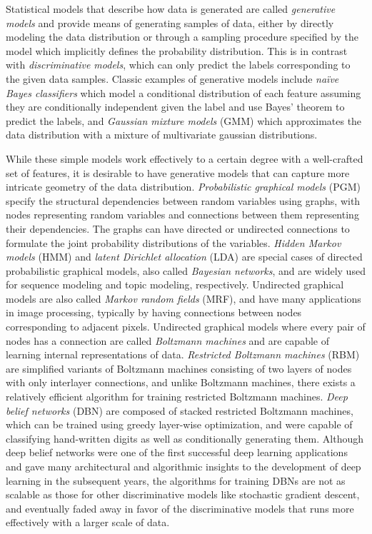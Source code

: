 Statistical models that describe how data is generated are called \emph{generative models} and provide means of generating samples of data, either by directly modeling the data distribution or through a sampling procedure specified by the model which implicitly defines the probability distribution.
This is in contrast with \emph{discriminative models}, which can only predict the labels corresponding to the given data samples.
Classic examples of generative models include \emph{na\"{i}ve Bayes classifiers} \cite{maron1961naive} which model a conditional distribution of each feature assuming they are conditionally independent given the label and use Bayes' theorem to predict the labels, and \emph{Gaussian mixture models} (GMM) \cite{everitt1981mixture} which approximates the data distribution with a mixture of multivariate gaussian distributions.

While these simple models work effectively to a certain degree with a well-crafted set of features, it is desirable to have generative models that can capture more intricate geometry of the data distribution.
\emph{Probabilistic graphical models} (PGM) specify the structural dependencies between random variables using graphs, with nodes representing random variables and connections between them representing their dependencies.
The graphs can have directed or undirected connections to formulate the joint probability distributions of the variables.
\emph{Hidden Markov models} (HMM) \cite{rabiner1989hmm} and \emph{latent Dirichlet allocation} (LDA) \cite{blei2003lda} are special cases of directed probabilistic graphical models, also called \emph{Bayesian networks}, and are widely used for sequence modeling and topic modeling, respectively.
Undirected graphical models are also called \emph{Markov random fields} (MRF), and have many applications in image processing, typically by having connections between nodes corresponding to adjacent pixels.
Undirected graphical models where every pair of nodes has a connection are called \emph{Boltzmann machines} and are capable of learning internal representations of data.
\emph{Restricted Boltzmann machines} (RBM) are simplified variants of Boltzmann machines consisting of two layers of nodes with only interlayer connections, and unlike Boltzmann machines, there exists a relatively efficient algorithm \cite{hinton2005cd} for training restricted Boltzmann machines.
\emph{Deep belief networks} (DBN) \cite{hinton2006dbn} are composed of stacked restricted Boltzmann machines, which can be trained using greedy layer-wise optimization, and were capable of classifying hand-written digits as well as conditionally generating them.
Although deep belief networks were one of the first successful deep learning applications and gave many architectural and algorithmic insights to the development of deep learning in the subsequent years, the algorithms for training DBNs are not as scalable as those for other discriminative models like stochastic gradient descent, and eventually faded away in favor of the discriminative models that runs more effectively with a larger scale of data.


